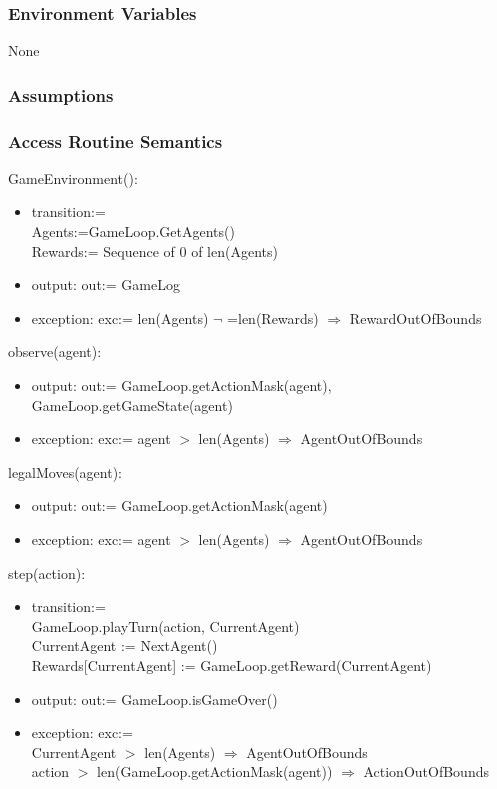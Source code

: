 \documentclass[12pt, titlepage]{article}
\begin{document}
\subsubsection{Environment Variables}
None

\subsubsection{Assumptions}


\subsubsection{Access Routine Semantics}

\noindent GameEnvironment():
\begin{itemize}
\item transition:= \\Agents:=GameLoop.GetAgents() \\ Rewards:= Sequence of 0 of len(Agents)
\item output: out:= GameLog
\item exception: exc:= len(Agents) $\neg$ =len(Rewards) $\Rightarrow$ RewardOutOfBounds
\end{itemize}

\noindent observe(agent):
\begin{itemize}
\item output: out:= GameLoop.getActionMask(agent), GameLoop.getGameState(agent)
\item exception: exc:= agent $>$ len(Agents) $\Rightarrow$ AgentOutOfBounds
\end{itemize}

\noindent legalMoves(agent):
\begin{itemize}
\item output: out:= GameLoop.getActionMask(agent)
\item exception: exc:= agent $>$ len(Agents) $\Rightarrow$ AgentOutOfBounds
\end{itemize}

\noindent step(action):
\begin{itemize}
\item transition:= \\
GameLoop.playTurn(action, CurrentAgent) \\
CurrentAgent := NextAgent() \\
Rewards[CurrentAgent] := GameLoop.getReward(CurrentAgent)
\item output: out:= GameLoop.isGameOver()
\item exception: exc:= \\
CurrentAgent $>$ len(Agents) $\Rightarrow$ AgentOutOfBounds \\
action $>$ len(GameLoop.getActionMask(agent)) $\Rightarrow$ ActionOutOfBounds \\
\end{itemize}
\end{document}
